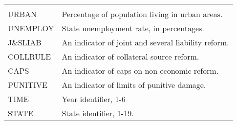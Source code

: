 \documentclass[]{book}
\begin{document}
\begin{longtable}[]{@{}ll@{}}
\begin{minipage}[t]{0.40\columnwidth}
\end{minipage}\tabularnewline
\begin{minipage}[t]{0.54\columnwidth}\raggedright
URBAN\strut
\end{minipage} & \begin{minipage}[t]{0.40\columnwidth}\raggedright
Percentage of population living in urban areas.\strut
\end{minipage}\tabularnewline
\begin{minipage}[t]{0.54\columnwidth}\raggedright
UNEMPLOY\strut
\end{minipage} & \begin{minipage}[t]{0.40\columnwidth}\raggedright
State unemployment rate, in percentages.\strut
\end{minipage}\tabularnewline
\begin{minipage}[t]{0.54\columnwidth}\raggedright
J\&SLIAB\strut
\end{minipage} & \begin{minipage}[t]{0.40\columnwidth}\raggedright
An indicator of joint and several liability reform.\strut
\end{minipage}\tabularnewline
\begin{minipage}[t]{0.54\columnwidth}\raggedright
COLLRULE\strut
\end{minipage} & \begin{minipage}[t]{0.40\columnwidth}\raggedright
An indicator of collateral source reform.\strut
\end{minipage}\tabularnewline
\begin{minipage}[t]{0.54\columnwidth}\raggedright
CAPS\strut
\end{minipage} & \begin{minipage}[t]{0.40\columnwidth}\raggedright
An indicator of caps on non-economic reform.\strut
\end{minipage}\tabularnewline
\begin{minipage}[t]{0.54\columnwidth}\raggedright
PUNITIVE\strut
\end{minipage} & \begin{minipage}[t]{0.40\columnwidth}\raggedright
An indicator of limits of punitive damage.\strut
\end{minipage}\tabularnewline
\begin{minipage}[t]{0.54\columnwidth}\raggedright
TIME\strut
\end{minipage} & \begin{minipage}[t]{0.40\columnwidth}\raggedright
Year identifier, 1-6\strut
\end{minipage}\tabularnewline
\begin{minipage}[t]{0.54\columnwidth}\raggedright
STATE\strut
\end{minipage} & \begin{minipage}[t]{0.40\columnwidth}\raggedright
State identifier, 1-19.\strut
\end{minipage}\tabularnewline
\bottomrule
\end{longtable}
\end{document}

